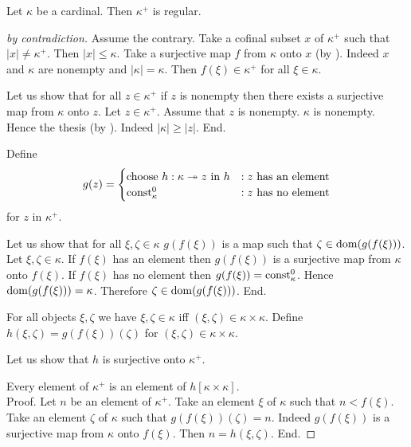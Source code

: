 \documentclass{article}
\begin{document}
  \begin{forthel}
    \begin{theorem*}[Hausdorff]
      Let $\kappa$ be a cardinal.
      Then $\kappa^+$ is regular.
    \end{theorem*}
    \begin{proof}[by contradiction]
      Assume the contrary.
      Take a cofinal subset $x$ of $\kappa^+$ such that $|x| \neq \kappa^+$.
      Then $|x| \leq \kappa$.
      Take a surjective map $f$ from $\kappa$ onto $x$ (by ).
      Indeed $x$ and $\kappa$ are nonempty and $|\kappa| = \kappa$.
      Then $f(\xi) \in \kappa^+$ for all $\xi \in \kappa$.

      Let us show that for all $z \in \kappa^+$ if $z$ is nonempty then there exists a surjective map from $\kappa$ onto $z$.
        Let $z \in \kappa^+$.
        Assume that $z$ is nonempty.
        $\kappa$ is nonempty.
        Hence the thesis (by ).
        Indeed $|\kappa| \geq |z|$.
      End.

      Define \[ g(z) =
        \begin{cases}
          \text{choose $h : \kappa \twoheadrightarrow z$ in $h$}
          & : \text{$z$ has an element}
          \\
          \text{$\textrm{const}_{\kappa}^{0}$}
          & : \text{$z$ has no element}
        \end{cases}
      \] for $z$ in $\kappa^+$.

      Let us show that for all $\xi, \zeta \in \kappa$ $g(f(\xi))$ is a map such that $\zeta \in \operatorname{dom}(g(f(\xi)))$.
        Let $\xi, \zeta \in \kappa$.
        If $f(\xi)$ has an element then $g(f(\xi))$ is a surjective map from $\kappa$ onto $f(\xi)$.
        If $f(\xi)$ has no element then $g(f(\xi)) = \textrm{const}_{\kappa}^{0}$.
        Hence $\operatorname{dom}(g(f(\xi))) = \kappa$.
        Therefore $\zeta \in \operatorname{dom}(g(f(\xi)))$.
      End.

      For all objects $\xi, \zeta$ we have $\xi, \zeta \in \kappa$ iff $(\xi, \zeta) \in \kappa \times \kappa$.
      Define $h(\xi,\zeta) = g(f(\xi))(\zeta)$ for $(\xi,\zeta) \in \kappa \times \kappa$.

      Let us show that $h$ is surjective onto $\kappa^+$.

        Every element of $\kappa^+$ is an element of $h[\kappa \times \kappa]$. \\
        Proof.
          Let $n$ be an element of $\kappa^+$.
          Take an element $\xi$ of $\kappa$ such that $n < f(\xi)$.
          Take an element $\zeta$ of $\kappa$ such that $g(f(\xi))(\zeta) = n$.
          Indeed $g(f(\xi))$ is a surjective map from $\kappa$ onto $f(\xi)$.
          Then $n = h(\xi,\zeta)$.
        End.


\end{proof}
\end{forthel}
\end{document}
